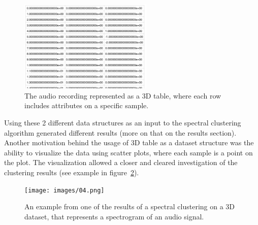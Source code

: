 \documentclass[10pt,twocolumn]{article}
\begin{document}
\begin{enumerate}
\begin{enumerate}
\begin{enumerate}
      \begin{figure}[!h]
        \begin{center}
          \includegraphics[width=2.5in]{images/03.png}
        \end{center}

        \caption{The audio recording represented as a 3D table, where each row includes attributes on a specific sample.}
        \label{table}
      \end{figure}

    \end{enumerate}
    Using these 2 different data structures as an input to the spectral clustering algorithm generated different results (more on that on the results section). Another motivation behind the usage of 3D table as a dataset structure was the ability to visualize the data using scatter plots, where each sample is a point on the plot. The visualization allowed a closer and cleared investigation of the clustering results (see example in figure~\ref{clustering-example}).

  \end{enumerate}

  \begin{figure}[!h]
    \begin{center}
      \texttt{[image: images/04.png]}
    \end{center}
    \caption{An example from one of the results of a spectral clustering on a 3D dataset, that represents a spectrogram of an audio signal.}
    \label{clustering-example}
  \end{figure}


\end{enumerate}
\end{document}
